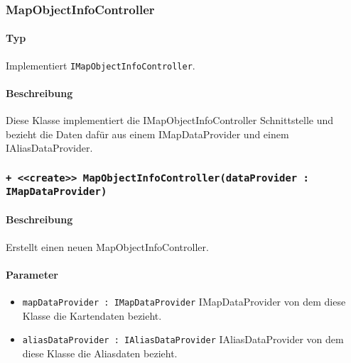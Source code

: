 \subsubsection{MapObjectInfoController}
\paragraph*{Typ}
Implementiert \texttt{IMapObjectInfoController}.
\paragraph*{Beschreibung}
Diese Klasse implementiert die IMapObjectInfoController Schnittstelle und bezieht die Daten 
dafür aus einem IMapDataProvider und einem IAliasDataProvider.

\subsubsection*{\texttt{+ <<create>> MapObjectInfoController(dataProvider : IMapDataProvider)}}%
\paragraph*{Beschreibung}
Erstellt einen neuen MapObjectInfoController.
\paragraph*{Parameter}
\begin{itemize}
    \item \texttt{mapDataProvider : IMapDataProvider} IMapDataProvider von dem diese Klasse die Kartendaten bezieht.
    \item \texttt{aliasDataProvider : IAliasDataProvider} IAliasDataProvider von dem diese Klasse die Aliasdaten bezieht.
\end{itemize}
